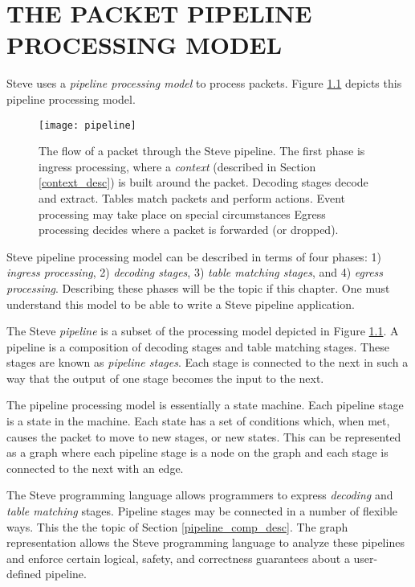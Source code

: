 \chapter{THE PACKET PIPELINE PROCESSING MODEL} \label{ch:pipeline_model}

Steve uses a \textit{pipeline processing model} to process packets. Figure
\ref{fg:pipeline_model} depicts this pipeline processing model.

\begin{figure} [ht] \texttt{[image: pipeline]}

\caption{The flow of a packet through the Steve pipeline. The first phase is
ingress processing, where a \textit{context} (described in Section
\ref{context_desc}) is built around the packet. Decoding stages decode and
extract. Tables match packets and perform actions. Event processing may take
place on special circumstances Egress processing decides where a packet is
forwarded (or dropped).} \label{fg:pipeline_model} 
\end{figure}

Steve pipeline processing model can be described in terms of four phases: 1)
\textit{ingress processing}, 2) \textit{decoding stages}, 3) \textit{table
matching stages}, and 4) \textit{egress processing}. Describing these phases will be the topic if this chapter. One must understand this model to be able to write a Steve pipeline application.

The Steve \textit{pipeline} is a subset of the processing model depicted in Figure \ref{fg:pipeline_model}. A pipeline is a composition of decoding stages and table matching stages. These stages are known as \textit{pipeline stages}. Each stage is connected to the next in such a way that the output of
one stage becomes the input to the next. 

The pipeline processing model is essentially a
state machine. Each pipeline stage is a state in the machine. Each state has a
set of conditions which, when met, causes the packet to move to new stages, or
new states. This can be represented as a graph where each pipeline stage is a
node on the graph and each stage is connected to the next with an edge. 

The Steve programming language allows programmers to express
\textit{decoding} and \textit{table matching} stages. Pipeline stages may be connected in a number of flexible ways. This the the topic of Section \ref{pipeline_comp_desc}. The graph representation allows the Steve programming language to analyze these
pipelines and enforce certain logical, safety, and correctness guarantees about
a user-defined pipeline.

